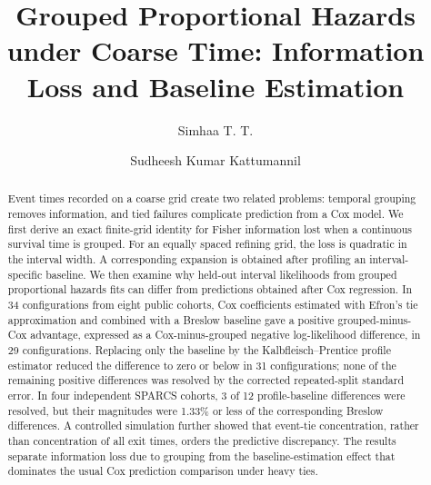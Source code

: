 \documentclass[smallextended,natbib]{svjour3}
\begin{document}
\raggedbottom

\title{Grouped Proportional Hazards under Coarse Time: Information Loss and Baseline Estimation}

\author{Simhaa T. T. \and Sudheesh Kumar Kattumannil}


\maketitle

\begin{abstract}
Event times recorded on a coarse grid create two related problems: temporal grouping removes information, and tied failures complicate prediction from a Cox model. We first derive an exact finite-grid identity for Fisher information lost when a continuous survival time is grouped. For an equally spaced refining grid, the loss is quadratic in the interval width. A corresponding expansion is obtained after profiling an interval-specific baseline. We then examine why held-out interval likelihoods from grouped proportional hazards fits can differ from predictions obtained after Cox regression. In 34 configurations from eight public cohorts, Cox coefficients estimated with Efron's tie approximation and combined with a Breslow baseline gave a positive grouped-minus-Cox advantage, expressed as a Cox-minus-grouped negative log-likelihood difference, in 29 configurations. Replacing only the baseline by the Kalbfleisch--Prentice profile estimator reduced the difference to zero or below in 31 configurations; none of the remaining positive differences was resolved by the corrected repeated-split standard error. In four independent SPARCS cohorts, 3 of 12 profile-baseline differences were resolved, but their magnitudes were 1.33\% or less of the corresponding Breslow differences. A controlled simulation further showed that event-tie concentration, rather than concentration of all exit times, orders the predictive discrepancy. The results separate information loss due to grouping from the baseline-estimation effect that dominates the usual Cox prediction comparison under heavy ties.
\end{abstract}
\end{document}
